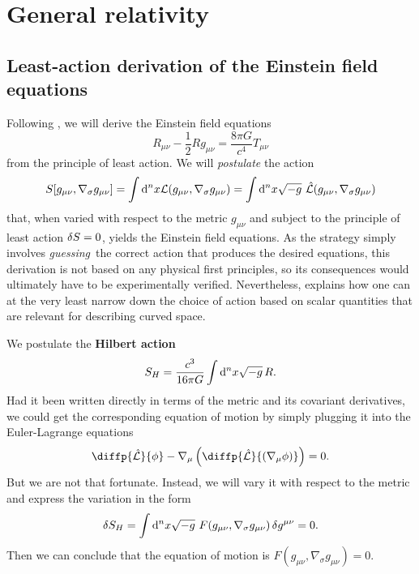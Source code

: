 \appendix

\chapter{General relativity}

\section{Least-action derivation of the Einstein field equations}
\label{sec:einstein_derivation}

Following \cite[section 4.3]{ref:carroll}, we will derive the Einstein field equations
\begin{equation}
	R_{\mu \nu} - \frac{1}{2} R g_{\mu \nu} = \frac{8 \pi G}{c^4} T_{\mu \nu}
\end{equation}
from the principle of least action.
We will \emph{postulate} the action
\begin{equation}
	S[g_{\mu \nu}, \nabla_\sigma g_{\mu \nu}] = \int \dif^n x \lagr(g_{\mu \nu}, \nabla_\sigma g_{\mu \nu})
	                                          = \int \dif^n x \sqrt{-g} \hat{\lagr}(g_{\mu \nu}, \nabla_\sigma g_{\mu \nu})
\end{equation}
that, when varied with respect to the metric $g_{\mu \nu}$ and subject to the principle of least action $\delta S = 0$, yields the Einstein field equations.
As the strategy simply involves \emph{guessing} the correct action that produces the desired equations, this derivation is not based on any physical first principles, so its consequences would ultimately have to be experimentally verified.
Nevertheless, \cite[page 160-161]{ref:carroll} explains how one can at the very least narrow down the choice of action based on scalar quantities that are relevant for describing curved space.

We postulate the \textbf{Hilbert action}
\begin{equation}
	S_H = \frac{c^3}{16 \pi G} \int \mathop{}\!\mathrm{d}^n x \sqrt{-g} \, R .
	\label{eq:einstein_derivation:hilbert_action}
\end{equation}
Had it been written directly in terms of the metric and its covariant derivatives, we could get the corresponding equation of motion by simply plugging it into the Euler-Lagrange equations
\begin{equation}
	\diffp{\hat{\lagr}}{\phi} - \nabla_\mu \left( \diffp{\hat{\lagr}}{{\left(\nabla_\mu \phi\right)}} \right) = 0 .
\end{equation}
But we are not that fortunate.
Instead, we will vary it with respect to the metric and express the variation in the form 
\begin{equation}
	\variation{S_H} = \int \dif^n x \sqrt{-g} F(g_{\mu \nu}, \nabla_\sigma g_{\mu \nu}) \, \variation{g^{\mu \nu}} = 0 .
	\label{eq:einstein_derivation:action_form}
\end{equation}
Then we can conclude that the equation of motion is $F(g_{\mu \nu}, \nabla_\sigma g_{\mu \nu}) = 0$.

